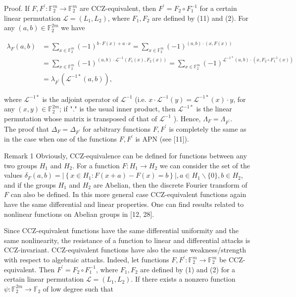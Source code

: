 \documentclass[10pt]{article}
\begin{document}
Proof. If $F, F^{\prime}: \mathbb{F}_{2}^{m} \rightarrow \mathbb{F}_{2}^{m}$ are CCZ-equivalent, then $F^{\prime}=F_{2} \circ F_{1}^{-1}$ for a certain linear permutation $\mathcal{L}=\left(L_{1}, L_{2}\right)$, where $F_{1}, F_{2}$ are defined by (11) and (2). For any $(a, b) \in \mathbb{F}_{2}^{2 m}$ we have

$$
\begin{aligned}
\lambda_{F}(a, b) & =\sum_{x \in \mathbb{F}_{2}^{m}}(-1)^{b \cdot F(x)+a \cdot x}=\sum_{x \in \mathbb{F}_{2}^{m}}(-1)^{(a, b) \cdot(x, F(x))} \\
& =\sum_{x \in \mathbb{F}_{2}^{m}}(-1)^{(a, b) \cdot \mathcal{L}^{-1}\left(F_{1}(x), F_{2}(x)\right)}=\sum_{x \in \mathbb{F}_{2}^{m}}(-1)^{\mathcal{L}^{-1 *}(a, b) \cdot\left(x, F_{2} \circ F_{1}^{-1}(x)\right)} \\
& =\lambda_{F^{\prime}}\left(\mathcal{L}^{-1 *}(a, b)\right),
\end{aligned}
$$

where $\mathcal{L}^{-1 *}$ is the adjoint operator of $\mathcal{L}^{-1}$ (i.e. $x \cdot \mathcal{L}^{-1}(y)=\mathcal{L}^{-1 *}(x) \cdot y$, for any $(x, y) \in \mathbb{F}_{2}^{2 m}$; if "." is the usual inner product, then $\mathcal{L}^{-1 *}$ is the linear permutation whose matrix is transposed of that of $\mathcal{L}^{-1}$ ). Hence, $\Lambda_{F}=\Lambda_{F^{\prime}}$.\\
The proof that $\Delta_{F}=\Delta_{F^{\prime}}$ for arbitrary functions $F, F^{\prime}$ is completely the same as in the case when one of the functions $F, F^{\prime}$ is APN (see [11]).

Remark 1 Obviously, CCZ-equivalence can be defined for functions between any two groups $H_{1}$ and $H_{2}$. For a function $F: H_{1} \rightarrow H_{2}$ we can consider the set of the values $\delta_{F}(a, b)=\left|\left\{x \in H_{1}: F(x+a)-F(x)=b\right\}\right|, a \in H_{1} \backslash\{0\}, b \in H_{2}$, and if the groups $H_{1}$ and $H_{2}$ are Abelian, then the discrete Fourier transform of $F$ can also be defined. In this more general case CCZ-equivalent functions again have the same differential and linear properties. One can find results related to nonlinear functions on Abelian groups in [12, 28].

Since CCZ-equivalent functions have the same differential uniformity and the same nonlinearity, the resistance of a function to linear and differential attacks is CCZ-invariant. CCZ-equivalent functions have also the same weakness/strength with respect to algebraic attacks. Indeed, let functions $F, F^{\prime}: \mathbb{F}_{2}^{m} \rightarrow \mathbb{F}_{2}^{m}$ be CCZ-equivalent. Then $F^{\prime}=F_{2} \circ F_{1}^{-1}$, where $F_{1}, F_{2}$ are defined by (1) and (2) for a certain linear permutation $\mathcal{L}=\left(L_{1}, L_{2}\right)$. If there exists a nonzero function $\psi: \mathbb{F}_{2}^{2 m} \rightarrow \mathbb{F}_{2}$ of low degree such that
\end{document}
